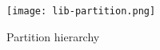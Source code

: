 \begin{figure}[H]
    \centering
    \texttt{[image: lib-partition.png]}
    \caption{Partition hierarchy}\label{fig:partition_hierarchy}
\end{figure}
